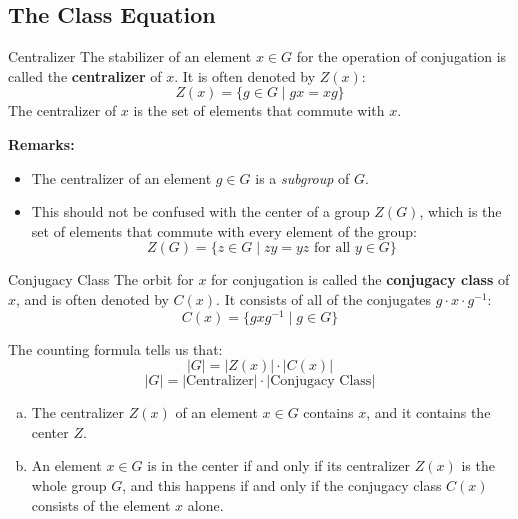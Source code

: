 \documentclass[letterpaper]{article}
\begin{document}
\subsection{The Class Equation}
\begin{definition}{Centralizer}{}
    The stabilizer of an element $x \in G$ for the operation of conjugation is called the \textbf{centralizer} of $x$. It is often denoted by $Z(x)$: 
    \[Z(x) = \{g \in G \mid gx = xg\}\]
    The centralizer of $x$ is the set of elements that commute with $x$. 
\end{definition}
\textbf{Remarks:}
\begin{itemize}
    \item The centralizer of an element $g \in G$ is a \emph{subgroup} of $G$. 
    \item This should not be confused with the center of a group $Z(G)$, which is the set of elements that commute with every element of the group: 
    \[Z(G) = \{z \in G \mid zy = yz \text{ for all } y \in G\}\]
\end{itemize}

\begin{definition}{Conjugacy Class}{}
    The orbit for $x$ for conjugation is called the \textbf{conjugacy class} of $x$, and is often denoted by $C(x)$. It consists of all of the conjugates $g \cdot x \cdot g^{-1}$:
    \[C(x) = \{gxg^{-1} \mid g \in G\}\]
\end{definition}

The counting formula tells us that: 
\[|G| = |Z(x)| \cdot |C(x)|\]
\[|G| = |\text{Centralizer}| \cdot |\text{Conjugacy Class}|\]

\begin{mdframed}
    \begin{proposition}
        \begin{enumerate}[(a)]
            \item The centralizer $Z(x)$ of an element $x \in G$ contains $x$, and it contains the center $Z$. 
            \item An element $x \in G$ is in the center if and only if its centralizer $Z(x)$ is the whole group $G$, and this happens if and only if the conjugacy class $C(x)$ consists of the element $x$ alone. 
        \end{enumerate}
    \end{proposition}
\end{mdframed}
\end{document}
